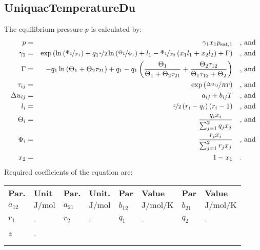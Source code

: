 \subsection{UniquacTemperatureDu}
\label{cha:approaches:abs:act:uniquac_tdu}
%
The equilibrium pressure $p$ is calculated by:
%
\begin{equation*}
	\begin{split}
		p &=& \gamma_1 x_1 p_\mathrm{sat,1} & \quad\text{, and} \\
		\gamma_1 &=& \exp \left( \ln \left( \nicefrac{\Phi_1}{x_1} \right) + q_1 \nicefrac{z}{2} \ln \left( \nicefrac{\Theta_1}{\Phi_1} \right) + l_1 - \nicefrac{\Phi_1}{x_2} \left( x_1 l_1 + x_2 l_2 \right) + \Gamma \right) & \quad\text{, and} \\
		\Gamma &=& - q_1 \ln \left( \Theta_1 + \Theta_2 \tau_{21} \right) + q_1 - q_1 \left( \frac{\Theta_1}{\Theta_1 + \Theta_2 \tau_{21}} + \frac{\Theta_2 \tau_{12}}{\Theta_1 \tau_{12} + \Theta_2} \right) & \quad\text{, and} \\
		\tau_{ij} &=& \exp \left( \nicefrac{\Delta u_{ij}}{R T} \right) & \quad\text{, and} \\
		\Delta u_{ij} &=& a_{ij} + b_{ij} T & \quad\text{, and} \\
		l_i &=& \nicefrac{z}{2} \left( r_i - q_i \right) \left(r_i - 1 \right) & \quad\text{, and} \\
		\Theta_i &=& \frac{q_i x_i}{\sum_{j=1}^{2} q_j x_j} & \quad\text{, and} \\
		\Phi_i &=& \frac{r_i x_i}{\sum_{j=1}^{2} r_j x_j} & \quad\text{, and} \\
		x_2 &=& 1 - x_1  & \quad\text{.} \\
	\end{split}
\end{equation*}
%
Required coefficients of the equation are:
%
\begin{longtable}[l]{ll|ll|ll|ll}
\toprule
\addlinespace
\textbf{Par.} & \textbf{Unit} & \textbf{Par.} &	\textbf{Unit.} & \textbf{Par} & \textbf{Value} & \textbf{Par} & \textbf{Value} \\
\addlinespace
\midrule
\endhead

\bottomrule
\endfoot
\bottomrule
\endlastfoot
\addlinespace

$a_{12}$ & $\si{\joule\per\mole}$ & $a_{21}$ & $\si{\joule\per\mole}$ &$b_{12}$ & $\si{\joule\per\mole\per\kelvin}$ &$b_{21}$ & $\si{\joule\per\mole\per\kelvin}$ \\
$r_{1}$ & - &$r_{2}$ & - &$q_{1}$ & - &$q_{2}$ & - \\
$z$ & - & &  & &  & & \\

\addlinespace
\end{longtable}

